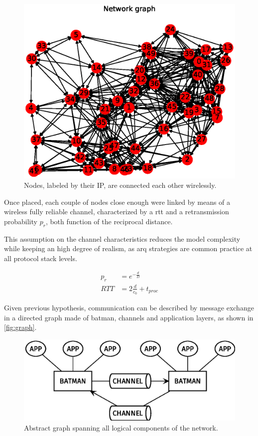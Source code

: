 \documentclass[conference]{IEEEtran}
\begin{document}
\begin{figure}[h]
  \centering
  \hspace{-0.7cm}%
  \includegraphics[width=1.1\linewidth]{figures/example_graph}
  \caption{Nodes, labeled by their IP, are connected each other wirelessly.}
  \label{fig:nodes}
\end{figure}

Once placed, each couple of nodes close enough were linked by means of a
wireless fully reliable channel, characterized by a \gls{rtt} and a
retransmission probability $p_r$, both function of the reciprocal distance.

This assumption on the channel characteristics reduces the model complexity
while keeping an high degree of realism, as \gls{arq} strategies are common
practice at all protocol stack levels.

\begin{equation}
  \begin{split}
    p_r & = e^{-\frac{d}{D}} \\
    RTT &= 2 \frac{d}{c_0} + t_{proc}
  \end{split}
\end{equation}

Given previous hypothesis, communication can be described by message exchange in
a directed graph made of \gls{batman}, channels and application layers, as shown
in \autoref{fig:graph}.

\begin{figure}[h]
  \centering
  \includegraphics[width=\linewidth]{figures/layers_diagram}
  \caption{Abstract graph spanning all logical components of the network.}
  \label{fig:graph}
\end{figure}
\end{document}
